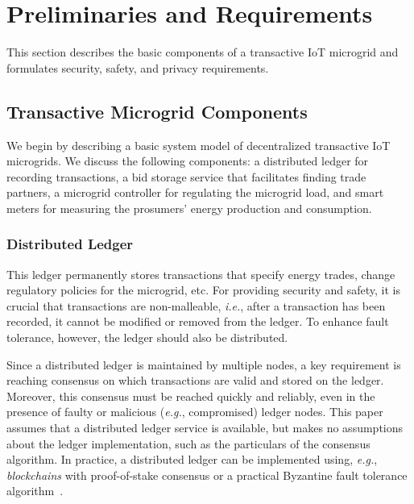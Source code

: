 \section{Preliminaries and Requirements}
This section describes the basic components of a transactive IoT
microgrid and formulates security, safety, and privacy requirements.

\subsection{Transactive Microgrid Components}

We begin by describing a basic system model of decentralized 
transactive IoT microgrids.  We discuss the following components: a
distributed ledger for recording transactions, a bid storage service
that facilitates finding trade partners, a microgrid controller for
regulating the microgrid load, and smart meters for measuring the
prosumers' energy production and consumption.

\subsubsection{Distributed Ledger}
This ledger permanently stores transactions that specify energy
trades, change regulatory policies for the microgrid, etc.  For
providing security and safety, it is crucial that transactions are
non-malleable, \emph{i.e.}, after a transaction has been recorded, it
cannot be modified or removed from the ledger.  To enhance fault
tolerance, however, the ledger should also be distributed.

Since a distributed ledger is maintained by multiple nodes, a key
requirement is reaching consensus on which transactions are valid and
stored on the ledger.  Moreover, this consensus must be reached
quickly and reliably, even in the presence of faulty or malicious
(\emph{e.g.}, compromised) ledger nodes.  This paper assumes that a
distributed ledger service is available, but makes no assumptions
about the ledger implementation, such as the particulars of the
consensus algorithm.  In practice, a distributed ledger can be
implemented using, \emph{e.g.}, \emph{blockchains} with proof-of-stake
consensus or a practical Byzantine fault tolerance
algorithm~\cite{castro1999practical}.

